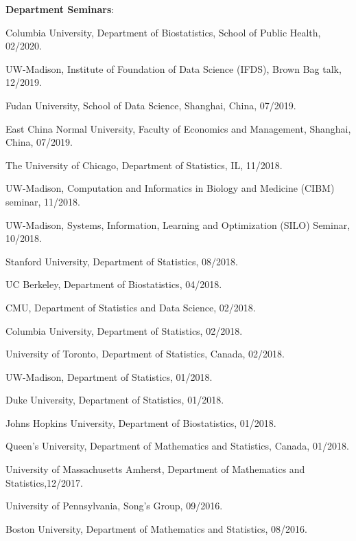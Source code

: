 \documentclass[letterpaper]{article}
\renewenvironment{itemize}{
  \begin{list}{}{
    \setlength{\leftmargin}{1.5em}
  }
}{
  \end{list}
}
\begin{document}
{\bf Department Seminars}:
\begin{itemize}
\item Columbia University, Department of Biostatistics, School of Public Health, 02/2020. 
\item UW-Madison, Institute of Foundation of Data Science (IFDS), Brown Bag talk, 12/2019.
\item Fudan University, School of Data Science, Shanghai, China, 07/2019.
\item East China Normal University, Faculty of Economics and Management, Shanghai, China, 07/2019.
\item The University of Chicago, Department of Statistics, IL, 11/2018.
\item UW-Madison, Computation and Informatics in Biology and Medicine (CIBM) seminar, 11/2018.
\item UW-Madison, Systems, Information, Learning and Optimization (SILO) Seminar, 10/2018.
\item Stanford University, Department of Statistics, 08/2018.
\item UC Berkeley, Department of Biostatistics, 04/2018.
\item CMU, Department of Statistics and Data Science, 02/2018.
\item Columbia University, Department of Statistics, 02/2018.
\item University of Toronto, Department of Statistics, Canada, 02/2018.
\item UW-Madison, Department of Statistics, 01/2018.
\item Duke University, Department of Statistics, 01/2018.
\item Johns Hopkins University, Department of Biostatistics, 01/2018.
\item Queen's University, Department of Mathematics and Statistics, Canada, 01/2018.
\item University of Massachusetts Amherst, Department of Mathematics and Statistics,12/2017.
\item University of Pennsylvania, Song's Group, 09/2016.
\item Boston University, Department of Mathematics and Statistics, 08/2016. 
\end{itemize}
\end{document}
